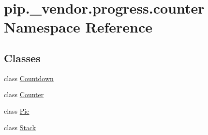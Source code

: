\hypertarget{namespacepip_1_1__vendor_1_1progress_1_1counter}{}\section{pip.\+\_\+vendor.\+progress.\+counter Namespace Reference}
\label{namespacepip_1_1__vendor_1_1progress_1_1counter}
\subsection*{Classes}
\begin{DoxyCompactItemize}
\item 
class \hyperlink{classpip_1_1__vendor_1_1progress_1_1counter_1_1Countdown}{Countdown}
\item 
class \hyperlink{classpip_1_1__vendor_1_1progress_1_1counter_1_1Counter}{Counter}
\item 
class \hyperlink{classpip_1_1__vendor_1_1progress_1_1counter_1_1Pie}{Pie}
\item 
class \hyperlink{classpip_1_1__vendor_1_1progress_1_1counter_1_1Stack}{Stack}
\end{DoxyCompactItemize}
